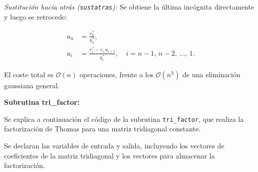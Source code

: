 \documentclass[11pt,a4paper]{article}
\begin{document}
\medskip

\textit{Sustituci\'on hacia atr\'as (\texttt{sustatras}):}
Se obtiene la \'ultima inc\'ognita directamente y luego se retrocede:

\begin{align}
u_n &= \frac{r_n^{\,*}}{b_n^{\,*}}, \\[4pt]
u_i &= \frac{r_i^{\,*} - c_i\, u_{i+1}}{b_i^{\,*}},
\quad i = n-1,\, n-2,\, \ldots,\, 1.
\end{align}

El coste total es $\mathcal{O}(n)$ operaciones, frente a los
$\mathcal{O}(n^3)$ de una eliminaci\'on gaussiana general.

\textbf{Subrutina tri\_factor:}

Se explica a continuaci\'on el c\'odigo de la subrutina \verb|tri_factor|, 
que realiza la factorizaci\'on de Thomas para una matriz tridiagonal 
constante.

\medskip{}

Se declaran las variables de entrada y salida, incluyendo los vectores de 
coeficientes de la matriz tridiagonal y los vectores para almacenar la 
factorizaci\'on.
\end{document}
